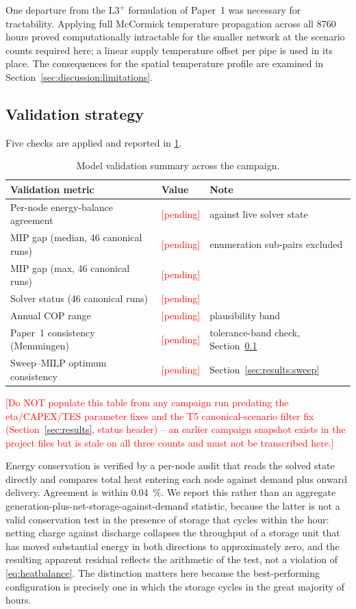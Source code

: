 \documentclass[review,3p]{elsarticle}
\newcommand{\placeholder}[1]{\textcolor{red}{[#1]}}
\newcommand{\Lplus}{\mathrm{L3}^{+}}
\begin{document}
One departure from the $\Lplus$ formulation of Paper~1 was necessary for
tractability. Applying full McCormick temperature propagation across all
\num{8760} hours proved computationally intractable for the smaller
network at the scenario counts required here; a linear supply
temperature offset per pipe is used in its place. The consequences for
the spatial temperature profile are examined in
Section~\ref{sec:discussion:limitations}.

\subsection{Validation strategy}
\label{sec:model:validation}

Five checks are applied and reported in \cref{tab:T5}.

\begin{table}[htbp]
  \centering
  \caption{Model validation summary across the campaign.}
  \label{tab:T5}
  \begin{tabular}{lll}
  \toprule
  Validation metric & Value & Note \\
  \midrule
  Per-node energy-balance agreement & \placeholder{pending} & against live solver state \\
  MIP gap (median, 46 canonical runs) & \placeholder{pending} & enumeration sub-pairs excluded \\
  MIP gap (max, 46 canonical runs) & \placeholder{pending} & \\
  Solver status (46 canonical runs) & \placeholder{pending} & \\
  Annual COP range & \placeholder{pending} & plausibility band \\
  Paper~1 consistency (Memmingen) & \placeholder{pending} & tolerance-band check, Section~\ref{sec:model:validation} \\
  Sweep--MILP optimum consistency & \placeholder{pending} & Section~\ref{sec:results:sweep} \\
  \bottomrule
  \end{tabular}
\end{table}
\placeholder{Do NOT populate this table from any campaign run predating
the eta/CAPEX/TES parameter fixes and the T5 canonical-scenario filter
fix (Section~\ref{sec:results}, status header) -- an earlier campaign
snapshot exists in the project files but is stale on all three counts
and must not be transcribed here.}

Energy conservation is verified by a per-node audit that reads the
solved state directly and compares total heat entering each node against
demand plus onward delivery. Agreement is within
\SI{0.04}{\percent}. We report this rather than an aggregate
generation-plus-net-storage-against-demand statistic, because the latter
is not a valid conservation test in the presence of storage that cycles
within the hour: netting charge against discharge collapses the
throughput of a storage unit that has moved substantial energy in both
directions to approximately zero, and the resulting apparent residual
reflects the arithmetic of the test, not a violation of
\cref{eq:heatbalance}. The distinction matters here because the
best-performing configuration is precisely one in which the storage
cycles in the great majority of hours.
\end{document}
